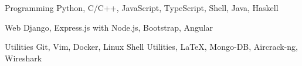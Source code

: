 


\begin{cvskills}


  \cvskill
  {Programming}
  {Python, C/C++, JavaScript, TypeScript, Shell, Java, Haskell}


  \cvskill
  {Web}
  {Django, Express.js with Node.js, Bootstrap, Angular}

  \cvskill
  {Utilities}
  {Git, Vim, Docker, Linux Shell Utilities, \LaTeX, Mongo-DB, Aircrack-ng, Wireshark}


\end{cvskills}

